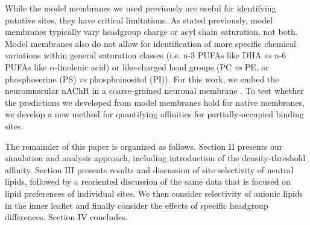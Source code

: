 \documentclass[%
 aip,
 amsmath,amssymb,
 preprint,%
]{revtex4-1}\usepackage{setspace}
\newcommand{\newaffinity}{density-threshold affinity}
\newcommand{\liam}[1]{\textcolor{black}{#1}}
\newcommand{\nachr}{nAChR}
\begin{document}
While the model membranes we used previously are useful for identifying putative sites, they have critical limitations.  As stated previously, model membranes typically vary headgroup charge or acyl chain saturation, not both. Model membranes also do not allow for identification of more specific chemical variations within general saturation classes (i.e. n-3 PUFAs like DHA {\it vs} n-6 PUFAs like $\alpha$-linolenic acid) or like-charged head groups (PC {\it vs} PE, or phosphoserine (PS) {\it vs} phosphoinositol (PI)). For this work, we embed the neuromuscular \nachr\cite{Unwin2005} in a coarse-grained neuronal membrane \cite{Ingolfsson2017b}. To test whether the predictions we developed from model membranes hold for native membranes, we develop a new method for quantifying affinities for partially-occupied binding sites.%

 The remainder of this paper is organized as follows. Section II presents our simulation and analysis approach, including introduction of the \newaffinity.  Section III presents results and discussion of site selectivity of neutral lipids, followed by a reoriented discussion of the same data that is focused on lipid preferences of individual sites. We then consider selectivity of anionic lipids in the inner leaflet and finally consider the effects of specific headgroup differences.  Section IV concludes.  

\end{document}
